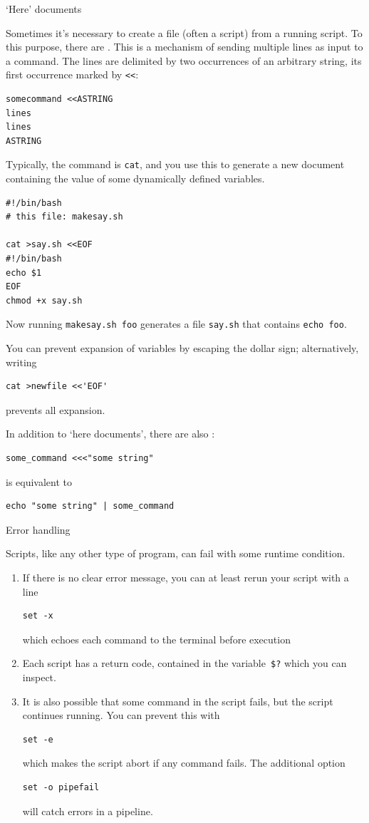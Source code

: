  {`Here' documents}

Sometimes it's necessary to create a file (often a script)
from a running script. To this purpose,
there are .
This is a mechanism of sending multiple lines as input
to a command.
The lines are delimited by
two occurrences of an arbitrary string,
its first occurrence marked by \lstinline+<<+:
\begin{lstlisting}
somecommand <<ASTRING
lines
lines
ASTRING
\end{lstlisting}
Typically, the command is \lstinline{cat},
and you use this to generate a new document
containing the value of some dynamically defined variables.
\begin{lstlisting}
#!/bin/bash
# this file: makesay.sh

cat >say.sh <<EOF
#!/bin/bash
echo $1
EOF
chmod +x say.sh
\end{lstlisting}
Now running \lstinline{makesay.sh foo}
generates a file \lstinline{say.sh} that contains \lstinline{echo foo}.

\begin{remark}
  You can prevent expansion of variables by
  escaping the dollar sign;
  alternatively, writing
\begin{lstlisting}
cat >newfile <<'EOF'
\end{lstlisting}
  prevents all expansion.
\end{remark}

\begin{remark}
  In addition to `here documents', there are also
  :
\begin{lstlisting}
some_command <<<"some string"    
\end{lstlisting}
is equivalent to
\begin{lstlisting}
echo "some string" | some_command
\end{lstlisting}
\end{remark}

 {Error handling}

Scripts, like any other type of program,
can fail with some runtime condition.

\begin{enumerate}
\item
  If there is no clear error message,
  you can at least rerun your script with a line
\begin{lstlisting}
set -x
\end{lstlisting}
which echoes each command to the terminal before execution
\item Each script has a return code,
  contained in the variable~\lstinline+$?+
  which you can inspect.
\item It is also possible that some command in the script
fails, but the script continues running.
You can prevent this with 
\begin{lstlisting}
set -e
\end{lstlisting}
which makes the script abort if any command fails.
The additional option 
\begin{lstlisting}
set -o pipefail
\end{lstlisting}
will catch errors in a pipeline.
\end{enumerate}

